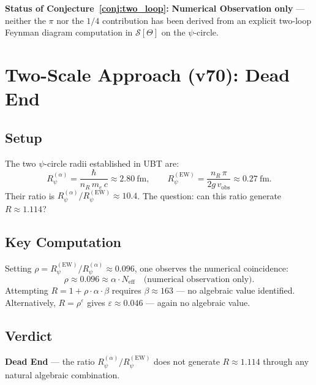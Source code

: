 \documentclass[11pt,a4paper]{article}
\theoremstyle{remark}
\begin{document}
\textbf{Status of Conjecture~\ref{conj:two_loop}:}
\textbf{Numerical Observation only} — neither the $\pi$ nor the $1/4$
contribution has been derived from an explicit two-loop Feynman diagram
computation in $\mathcal{S}[\Theta]$ on the $\psi$-circle.

\section{Two-Scale Approach (v70): Dead End}
\label{sec:two_scale}

\subsection{Setup}

The two $\psi$-circle radii established in UBT are:
\begin{equation}
  R_\psi^{(\alpha)} = \frac{\hbar}{n_R\,m_e\,c} \approx 2.80\ \text{fm},
  \qquad
  R_\psi^{(\mathrm{EW})} = \frac{n_R\,\pi}{2g\,v_{\mathrm{obs}}} \approx 0.27\ \text{fm}.
  \label{eq:two_scale_radii}
\end{equation}
Their ratio is $R_\psi^{(\alpha)}/R_\psi^{(\mathrm{EW})} \approx 10.4$.  The
question: can this ratio generate $R \approx 1.114$?

\subsection{Key Computation}

Setting $\rho = R_\psi^{(\mathrm{EW})}/R_\psi^{(\alpha)} \approx 0.096$, one
observes the numerical coincidence:
\begin{equation}
  \rho \approx 0.096 \approx \alpha \cdot N_{\mathrm{eff}}
  \quad\text{(numerical observation only).}
\end{equation}
Attempting $R = 1 + \rho \cdot \alpha \cdot \beta$ requires
$\beta \approx 163$ — no algebraic value identified.
Alternatively, $R = \rho^\varepsilon$ gives $\varepsilon \approx 0.046$
— again no algebraic value.

\subsection{Verdict}

\begin{center}
\textbf{Dead End} — the ratio $R_\psi^{(\alpha)}/R_\psi^{(\mathrm{EW})}$ does
not generate $R \approx 1.114$ through any natural algebraic combination.
\end{center}
\end{document}
